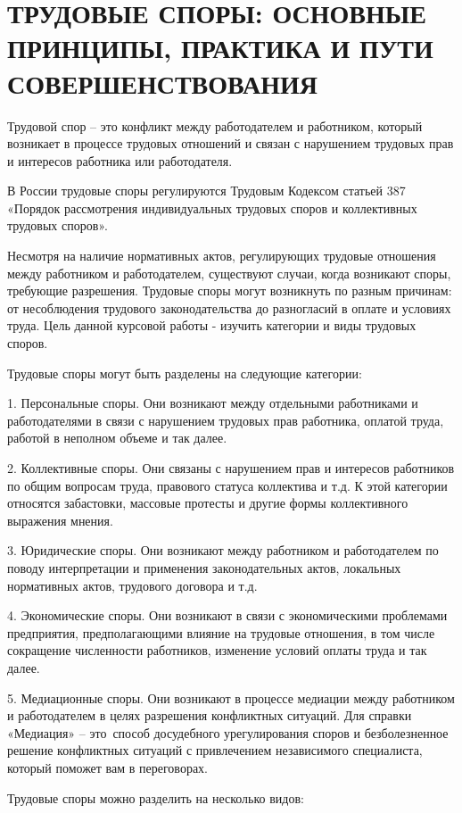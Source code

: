 \chapter{ТРУДОВЫЕ СПОРЫ: ОСНОВНЫЕ ПРИНЦИПЫ, ПРАКТИКА И ПУТИ СОВЕРШЕНСТВОВАНИЯ}

Трудовой спор – это конфликт между работодателем и работником, который возникает в процессе трудовых отношений и связан с нарушением трудовых прав и интересов работника или работодателя.

В России трудовые споры регулируются Трудовым Кодексом статьей 387 
«Порядок рассмотрения индивидуальных трудовых споров и коллективных трудовых споров».

Несмотря на наличие нормативных актов, регулирующих трудовые отношения 
между работником и работодателем, существуют случаи, когда возникают споры, 
требующие разрешения. Трудовые споры могут возникнуть по разным причинам: 
от несоблюдения трудового законодательства до разногласий в оплате и условиях труда.
 Цель данной курсовой работы - изучить категории и виды трудовых споров.

Трудовые споры могут быть разделены на следующие категории:

1. Персональные споры. Они возникают между отдельными работниками и работодателями в связи с нарушением трудовых прав работника, оплатой труда, работой в неполном объеме и так далее.

2. Коллективные споры. Они связаны с нарушением прав и интересов работников по общим вопросам труда, правового статуса коллектива и т.д. К этой категории относятся забастовки, массовые протесты и другие формы коллективного выражения мнения.

3. Юридические споры. Они возникают между работником и работодателем по поводу интерпретации и применения законодательных актов, локальных нормативных актов, трудового договора и т.д.

4. Экономические споры. 
Они возникают в связи с экономическими проблемами предприятия, 
предполагающими влияние на трудовые отношения, в том числе сокращение 
численности работников, изменение условий оплаты труда и так далее.

5. Медиационные споры. Они возникают в процессе медиации между работником и работодателем в целях разрешения конфликтных ситуаций. Для справки «Медиация» – это способ досудебного урегулирования споров и безболезненное решение конфликтных ситуаций с привлечением независимого специалиста, который поможет вам в переговорах.

Трудовые споры можно разделить на несколько видов:

